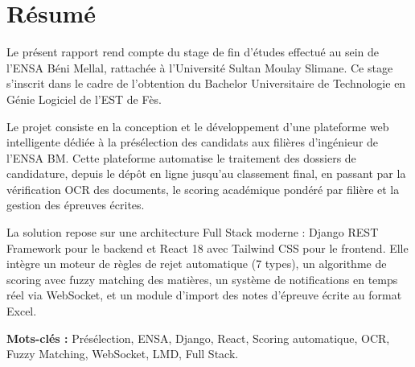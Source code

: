 \chapter*{Résumé}

Le présent rapport rend compte du stage de fin d'études effectué au sein de l'ENSA Béni Mellal, rattachée à l'Université Sultan Moulay Slimane. Ce stage s'inscrit dans le cadre de l'obtention du Bachelor Universitaire de Technologie en Génie Logiciel de l'EST de Fès.

Le projet consiste en la conception et le développement d'une plateforme web intelligente dédiée à la présélection des candidats aux filières d'ingénieur de l'ENSA BM. Cette plateforme automatise le traitement des dossiers de candidature, depuis le dépôt en ligne jusqu'au classement final, en passant par la vérification OCR des documents, le scoring académique pondéré par filière et la gestion des épreuves écrites.

La solution repose sur une architecture Full Stack moderne : Django REST Framework pour le backend et React 18 avec Tailwind CSS pour le frontend. Elle intègre un moteur de règles de rejet automatique (7 types), un algorithme de scoring avec fuzzy matching des matières, un système de notifications en temps réel via WebSocket, et un module d'import des notes d'épreuve écrite au format Excel.

\vspace{0.5cm}
\noindent\textbf{Mots-clés :} Présélection, ENSA, Django, React, Scoring automatique, OCR, Fuzzy Matching, WebSocket, LMD, Full Stack.
